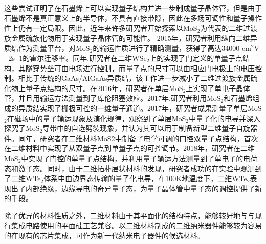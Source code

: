 这些尝试证明了在石墨烯上可以实现量子结构并进一步制成量子晶体管，但是由于石墨烯不是真正意义上的半导体，不具有直接带隙，因此在多场可调性和量子操作性上仍有一定局限。因此，近年来许多研究者开始探索以MoS$_2$为代表的二维过渡族金属硫族化物用于实现量子晶体管的可能性。
2015年，研究者利用纵向二维异质结作为测量平台，对MoS$_2$的输运性质进行了精确测量，获得了高达34000 cm$^2$V$^-2$s$^-1$的霍尔迁移率。同年,研究者在二维WSe$_2$上的实现了门定义的单量子点结构，其隧穿势垒可由电场进行控制，而量子点的尺寸可以由相应门电极上的电压控制。相比于传统的GaAs/AlGaAs异质结，该工作进一步减小了二维过渡族金属硫化物上量子点结构的尺寸。在2016年，研究者在单层MoS$_2$上实现了单电子晶体管，并且用输运方法测量到了库伦阻塞效应。2017年,研究者利用MoS$_2$和石墨烯组成的异质结实现了栅极可控的一维量子通道。2017年，研究者成果测量了单层MoS$_2$在磁场中的量子输运现象及演化规律，观察到了单层MoS$_2$中量子化的电导并深入探究了MoS$_2$导带中的自选劈裂现象，并认为其可以用于制备新型二维量子自旋器件。同年，研究者在二维材料MoS2中制备了电学可调的门控双量子点结构，首次在二维材料中实现了从双量子点到单量子点的可控调节。2018年，研究者在二维MoS$_2$中实现了门控的单量子点结构，并利用量子输运方法测量到了单电子的电荷态和激子态。同时，由于二维拓朴层状材料的发现，研究者成功的在实验中观测到了二维WTe$_2$体系中由边界态传输的量子化电导，在100K地温度下，二维WTe$_2$表现出了内部绝缘，边缘导电的奇异量子态，为量子晶体管中量子态的调控提供了新的手段。

除了优异的材料性质之外，二维材料由于其平面化的结构特点，能够较好地与与现行集成电路使用的平面硅工艺兼容。以二维材料制成的二维纳米器件能够较为容易的在现有的芯片集成，可作为新一代纳米电子器件的候选材料。

